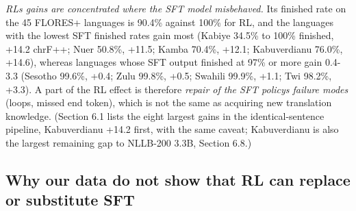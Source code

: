 \emph{RL\textquotesingle s gains are concentrated where the SFT model misbehaved.} Its finished rate on the 45 FLORES+ languages is 90.4\% against 100\% for RL, and the languages with the lowest SFT finished rates gain most (Kabiye 34.5\% to 100\% finished, +14.2 chrF++; Nuer 50.8\%, +11.5; Kamba 70.4\%, +12.1; Kabuverdianu 76.0\%, +14.6), whereas languages whose SFT output finished at 97\% or more gain 0.4-3.3 (Sesotho 99.6\%, +0.4; Zulu 99.8\%, +0.5; Swahili 99.9\%, +1.1; Twi 98.2\%, +3.3). A part of the RL effect is therefore \emph{repair of the SFT policy\textquotesingle s failure modes} (loops, missed end token), which is not the same as acquiring new translation knowledge. (Section 6.1 lists the eight largest gains in the identical-sentence pipeline, Kabuverdianu +14.2 first, with the same caveat; Kabuverdianu is also the largest remaining gap to NLLB-200 3.3B, Section 6.8.)

\subsection{Why our data do not show that RL can replace or substitute SFT}\label{why-our-data-do-not-show-that-rl-can-replace-or-substitute-sft}

